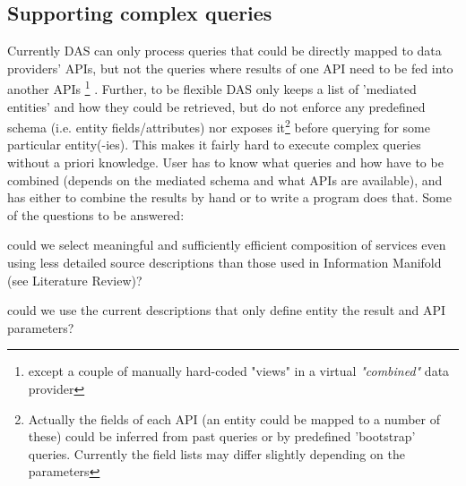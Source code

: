 \documentclass[a4paper,11pt,draft]{article}
\begin{document}
        
\subsection{Supporting complex queries}
Currently DAS can only process queries that could be directly mapped to data providers' APIs, but not the queries where results of one API need to be fed into another APIs 
	\footnote{except a couple of manually hard-coded "views" in a virtual \textit{"combined"} data provider}%
. %
Further, to be flexible DAS only keeps a list of 'mediated entities' and how they could be retrieved, but do not enforce any predefined schema (i.e. entity fields/attributes) nor exposes it\footnote{%
	Actually the fields of each API  (an entity could be mapped to a number of these) could be inferred 
	from past queries or by predefined 'bootstrap' queries. Currently the field lists may differ slightly depending on the parameters}
before querying for some particular entity(-ies). 
%
This makes it fairly hard to execute complex queries  without a priori knowledge.
User has to know what queries and how have to be combined (depends on the mediated schema and what APIs are available), and has either to combine the results by hand or to write a program does that.
%
Some of the questions to be answered:

	\begin{compactitem}
		\item could we select  meaningful and sufficiently efficient composition of services even using less detailed source descriptions than those used in Information Manifold (see Literature Review)?
		\item could we use the current descriptions that only define entity the result and API parameters?
	\end{compactitem}
	
\end{document}
